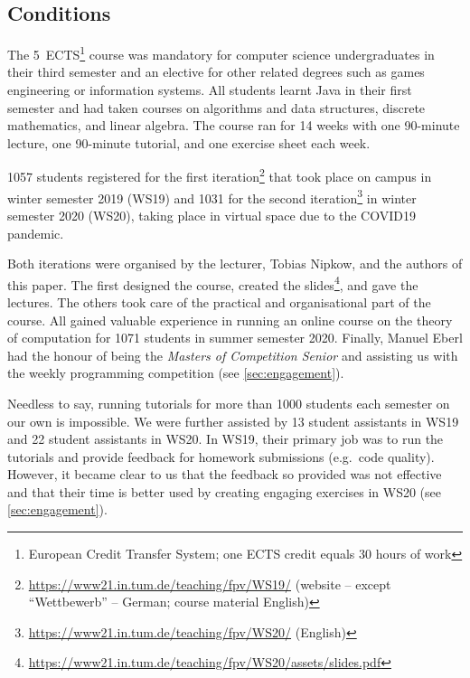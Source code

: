 \subsection{Conditions}

The 5~ECTS\footnote{European Credit Transfer System; one ECTS credit equals 30 hours of work} course was mandatory for computer science undergraduates in their third semester and
an elective for other related degrees such as games engineering or information systems.
All students learnt Java in their first semester and had taken courses on algorithms and data structures,
discrete mathematics, and linear algebra.
The course ran for 14 weeks with
one 90-minute lecture,
one 90-minute tutorial,
and one exercise sheet each week.

1057 students registered for
the first iteration\footnote{\url{https://www21.in.tum.de/teaching/fpv/WS19/} (website -- except ``Wettbewerb'' -- German; course material English)} that took place on campus in winter semester 2019 (WS19) and
1031 for the second iteration\footnote{\url{https://www21.in.tum.de/teaching/fpv/WS20/} (English)} in winter semester 2020 (WS20), taking place in virtual space due to the COVID19 pandemic.

Both iterations were organised by the lecturer, Tobias Nipkow, and the authors of this paper.
The first designed the course, created the slides\footnote{\url{https://www21.in.tum.de/teaching/fpv/WS20/assets/slides.pdf}}, and gave the lectures.
The others took care of the practical and organisational part of the course.
All gained valuable experience in running an online course on the theory of computation for 1071
students in summer semester 2020.
Finally, Manuel Eberl had the honour of being the \emph{Masters of Competition Senior} and assisting us with the weekly programming competition (see \cref{sec:engagement}).

Needless to say,
running tutorials for more than 1000
students each semester on our own is impossible.
We were further assisted by
13 student assistants in WS19 and
22 student assistants in WS20.
In WS19, their primary job was to run the tutorials and provide feedback for homework submissions (e.g.\ code quality).
However, it became clear to us
that the feedback so provided was not effective
and that their time is better used by creating engaging exercises in WS20 (see \cref{sec:engagement}).



